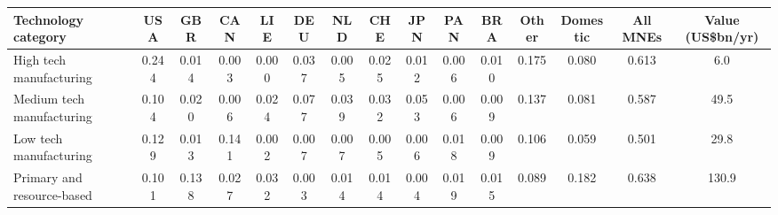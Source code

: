 \begin{tabular}{lcccccccccccccc}
\toprule
Technology category & USA & GBR & CAN & LIE & DEU & NLD & CHE & JPN & PAN & BRA & Other & Domestic & All MNEs & Value (US\$bn/yr) \\
\midrule
High tech manufacturing & 0.244 & 0.014 & 0.003 & 0.000 & 0.037 & 0.005 & 0.025 & 0.012 & 0.006 & 0.010 & 0.175 & 0.080 & 0.613 & 6.0 \\
Medium tech manufacturing & 0.104 & 0.020 & 0.006 & 0.024 & 0.077 & 0.039 & 0.032 & 0.053 & 0.006 & 0.009 & 0.137 & 0.081 & 0.587 & 49.5 \\
Low tech manufacturing & 0.129 & 0.013 & 0.141 & 0.002 & 0.007 & 0.007 & 0.005 & 0.006 & 0.018 & 0.009 & 0.106 & 0.059 & 0.501 & 29.8 \\
Primary and resource-based & 0.101 & 0.138 & 0.027 & 0.032 & 0.003 & 0.014 & 0.014 & 0.004 & 0.019 & 0.015 & 0.089 & 0.182 & 0.638 & 130.9 \\
\bottomrule
\end{tabular}
